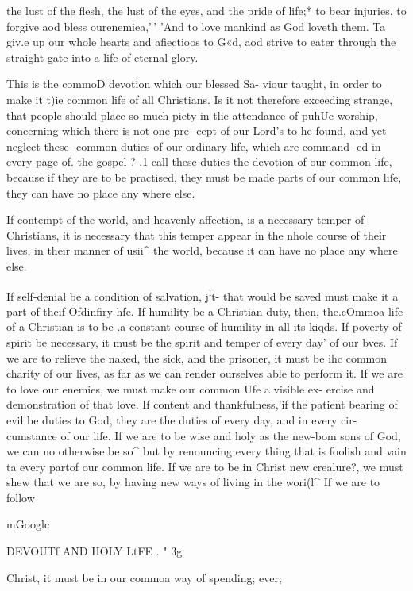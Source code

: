 \documentclass[
]{book}
\begin{document}
the lust of the flesh, the lust of the eyes, and the pride of life;* to bear injuries, to forgive aod bless ourenemiea,'\,' 'And to love mankind as God loveth them. Ta giv.e up our whole hearts and afiectioos to G«d, aod strive to eater through the straight gate into a life of eternal glory.

This is the commoD devotion which our blessed Sa- viour taught, in order to make it t)ie common life of all Christians. Is it not therefore exceeding strange, that people should place so much piety in tlie attendance of puhUc worship, concerning which there is not one pre- cept of our Lord's to he found, and yet neglect these- common duties of our ordinary life, which are command- ed in every page of. the gospel ? .1 call these duties the devotion of our common life, because if they are to be practised, they must be made parts of our common life, they can have no place any where else.

If contempt of the world, and heavenly affection, is a necessary temper of Christians, it is necessary that this temper appear in the nhole course of their lives, in their manner of usii\^{} the world, because it can have no place any where else.

If self-denial be a condition of salvation, j\textsuperscript{l}t- that would be saved must make it a part of theif Ofdinfiry hfe. If humility be a Christian duty, then, the.cOmmoa life of a Christian is to be .a constant course of humility in all its kiqds. If poverty of spirit be necessary, it must be the spirit and temper of every day' of our bves. If we are to relieve the naked, the sick, and the prisoner, it must be ihc common charity of our lives, as far as we can render ourselves able to perform it. If we are to love our enemies, we must make our common Ufe a visible ex- ercise and demonstration of that love. If content and thankfulness,'if the patient bearing of evil be duties to God, they are the duties of every day, and in every cir- cumstance of our life. If we are to be wise and holy as the new-bom sons of God, we can no otherwise be so\^{} but by renouncing every thing that is foolish and vain ta every partof our common life. If we are to be in Christ new crealure?, we must shew that we are so, by having new ways of living in the wori(l\^{} If we are to follow

mGooglc

DEVOUTf AND HOLY LtFE . " 3g

Christ, it must be in our commoa way of spending; ever;
\end{document}
